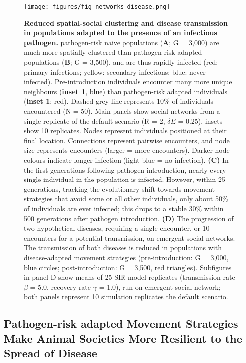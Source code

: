 \begin{figure}[p]
    \centering
    \texttt{[image: figures/fig\_networks\_disease.png]}
    \caption{
        \textbf{Reduced spatial-social clustering and disease transmission in populations adapted to the presence of an infectious pathogen.}
        pathogen-risk naive populations (\textbf{A}; G = 3,000) are much more spatially clustered than pathogen-risk adapted populations (\textbf{B}; G = 3,500), and are thus rapidly infected (red: primary infections; yellow: secondary infections; blue: never infected).
        Pre-introduction individuals encounter many more unique neighbours (\textbf{inset 1}, blue) than pathogen-risk adapted individuals (\textbf{inset 1}; red). 
        Dashed grey line represents 10\% of individuals encountered (N = 50).
        Main panels show social networks from a single replicate of the default scenario (R = 2, $\delta E$ = 0.25), insets show 10 replicates. Nodes represent individuals positioned at their final location. Connections represent pairwise encounters, and node size represents encounters (larger = more encounters). Darker node colours indicate longer infection (light blue = no infection). 
        \textbf{(C)} In the first generations following pathogen introduction, nearly every single individual in the population is infected. However, within 25 generations, tracking the evolutionary shift towards movement strategies that avoid some or all other individuals, only about 50\% of individuals are ever infected; this drops to a stable 30\% within 500 generations after pathogen introduction.
        \textbf{(D)} The progression of two hypothetical diseases, requiring a single encounter, or 10 encounters for a potential transmission, on emergent social networks. 
        The transmission of both diseases is reduced in populations with disease-adapted movement strategies (pre-introduction: G = 3,000, blue circles; post-introduction: G = 3,500, red triangles). Subfigures in panel D show means of 25 SIR model replicates (transmission rate $\beta$ = 5.0, recovery rate $\gamma$ = 1.0), run on emergent social network; both panels represent 10 simulation replicates the default scenario.
    }\label{fig_networks_disease}
\end{figure}

\subsection*{Pathogen-risk adapted Movement Strategies Make Animal Societies More Resilient to the Spread of Disease}

